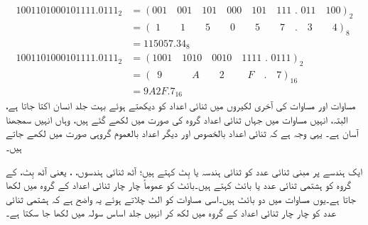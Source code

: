  \begin{align*}
 1001101000101111.0111_2&=(001\quad 001\quad 101\quad 000\quad 101\quad 111\,\, . \,\,011\quad 100)_2\\
 &=(\,\,1\quad \quad 1\quad \quad 5\quad \quad 0 \quad \quad 5\quad \quad 7\quad .\quad 3\quad \quad 4)_8\\
 &=115057.34_8\\
 1001101000101111.0111_2&=(1001\quad 1010\quad 0010\quad 1111\,\, . \,\,0111)_2\\
 &=(\,\,\,9\quad \quad \quad A\quad \quad 2\quad \quad \,\,F \quad . \quad 7)_{16}\\
 &=9A2F.7_{16}
 \end{align*}
	مساوات  اور مساوات  کی آخری لکیروں میں ثنائی اعداد کو دیکھتے ہوئے بہت جلد انسان اکتا جاتا ہے، البتہ، انہیں مساوات میں جہاں ثنائی اعداد گروہ کی صورت میں لکھے گئے ہیں، وہاں انہیں سمجھنا آسان ہے۔ یہی وجہ ہے کہ ثنائی اعداد بالخصوص اور دیگر اعداد بالعموم گروہی صورت میں لکھے جاتے ہیں۔
	
ایک ہندسے پر مبنی ثنائی عدد کو ثنائی ہندسہ یا بِٹ کہتے ہیں؛ آٹھ ثنائی ہندسوں، ، یعنی آٹھ بِٹ، کے گروہ کو ہشتمی ثنائی عدد یا بائٹ کہتے ہیں۔بائٹ کو عموماً چار چار ثنائی اعداد کے گروہ میں لکھا جاتا ہے۔یوں مساوات  میں دو بائٹ ہیں۔اسی مساوات کو الٹ چلاتے ہوئے یہ واضح ہے کہ ہشتمی ثنائی عدد کو چار چار ثنائی اعداد کے گروہ میں لکھ کر انہیں جلد اساس سولہ میں لکھا جا سکتا ہے۔
